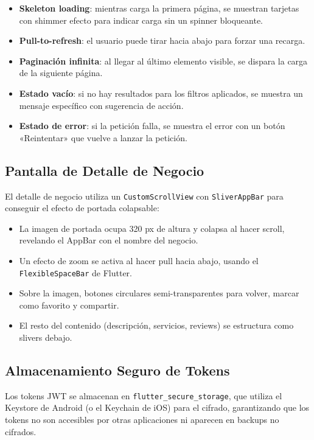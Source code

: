\documentclass[12pt,a4paper,twoside]{report}
\begin{document}
\begin{itemize}
  \item \textbf{Skeleton loading}: mientras carga la primera página, se muestran tarjetas con shimmer efecto para indicar carga sin un spinner bloqueante.
  \item \textbf{Pull-to-refresh}: el usuario puede tirar hacia abajo para forzar una recarga.
  \item \textbf{Paginación infinita}: al llegar al último elemento visible, se dispara la carga de la siguiente página.
  \item \textbf{Estado vacío}: si no hay resultados para los filtros aplicados, se muestra un mensaje específico con sugerencia de acción.
  \item \textbf{Estado de error}: si la petición falla, se muestra el error con un botón «Reintentar» que vuelve a lanzar la petición.
\end{itemize}

\subsection{Pantalla de Detalle de Negocio}

El detalle de negocio utiliza un \texttt{CustomScrollView} con \texttt{SliverAppBar} para conseguir el efecto de portada colapsable:

\begin{itemize}
  \item La imagen de portada ocupa 320 px de altura y colapsa al hacer scroll, revelando el AppBar con el nombre del negocio.
  \item Un efecto de zoom se activa al hacer pull hacia abajo, usando el \texttt{FlexibleSpaceBar} de Flutter.
  \item Sobre la imagen, botones circulares semi-transparentes para volver, marcar como favorito y compartir.
  \item El resto del contenido (descripción, servicios, reviews) se estructura como slivers debajo.
\end{itemize}

\subsection{Almacenamiento Seguro de Tokens}

Los tokens JWT se almacenan en \texttt{flutter\_secure\_storage}, que utiliza el Keystore de Android (o el Keychain de iOS) para el cifrado, garantizando que los tokens no son accesibles por otras aplicaciones ni aparecen en backups no cifrados.
\end{document}

